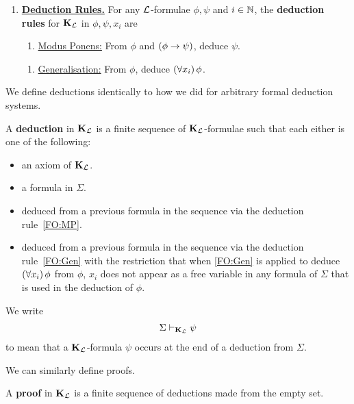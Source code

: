 \begin{boxdefinition}
\begin{enumerate}
        \item \textbf{\underline{Deduction Rules.}} For any $\mathcal{L}$-formulae $\phi, \psi$ and $i \in \mathbb{N}$, the \textbf{deduction rules} for $\KL$ in $\phi, \psi, x_i$ are
        \begin{enumerate}[label = \normalfont (MP)]
            \item\label{FO:MP}
            \underline{Modus Ponens:} From $\phi$ and $\left( \phi \to \psi \right)$, deduce $\psi$.
        \end{enumerate}
        \begin{enumerate}[label = \normalfont (Gen)]
            \item\label{FO:Gen}
            \underline{Generalisation:} From $\phi$, deduce $\left( \forall x_i \right)\phi$.
        \end{enumerate}
    \end{enumerate}
\end{boxdefinition}

We define deductions identically to how we did for arbitrary formal deduction systems.

\begin{boxdefinition}[Deductions in $\KL$]\label{Ch2:Def:Deductions_in_KL}
    A \textbf{deduction} in $\KL$ is a finite sequence of $\KL$-formulae such that each either is one of the following:
    \begin{itemize}
        \item an axiom of $\KL$.
        \item a formula in $\Sigma$.
        \item deduced from a previous formula in the sequence via the deduction rule~\ref{FO:MP}.
        \item deduced from a previous formula in the sequence via the deduction rule~\ref{FO:Gen} with the restriction that when \ref{FO:Gen} is applied to deduce $\left( \forall x_i \right)\phi$ from $\phi$, $x_i$ does not appear as a free variable in any formula of $\Sigma$ that is used in the deduction of $\phi$.
    \end{itemize}
     We write
    \begin{align*}
        \Sigma \vdash_{\mathbf{K}_{\mathcal{L}}} \psi
    \end{align*}
    to mean that a $\KL$-formula $\psi$ occurs at the end of a deduction from $\Sigma$.
\end{boxdefinition}

We can similarly define proofs.

\begin{boxdefinition}[Proofs in $\KL$]
    A \textbf{proof} in $\KL$ is a finite sequence of deductions made from the empty set.
\end{boxdefinition}


